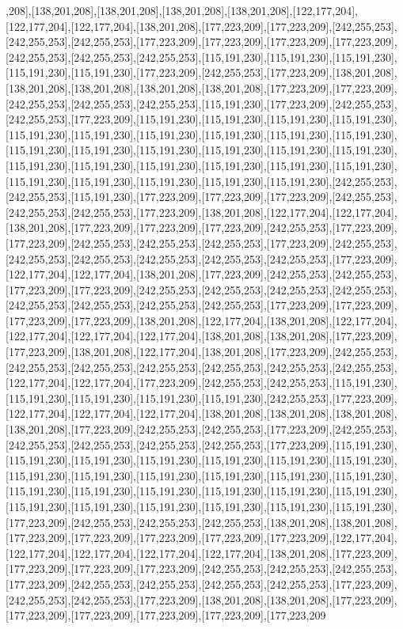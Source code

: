 ,208],[138,201,208],[138,201,208],[138,201,208],[138,201,208],[122,177,204],[122,177,204],[122,177,204],[138,201,208],[177,223,209],[177,223,209],[242,255,253],[242,255,253],[242,255,253],[177,223,209],[177,223,209],[177,223,209],[177,223,209],[242,255,253],[242,255,253],[242,255,253],[115,191,230],[115,191,230],[115,191,230],[115,191,230],[115,191,230],[177,223,209],[242,255,253],[177,223,209],[138,201,208],[138,201,208],[138,201,208],[138,201,208],[138,201,208],[177,223,209],[177,223,209],[242,255,253],[242,255,253],[242,255,253],[115,191,230],[177,223,209],[242,255,253],[242,255,253],[177,223,209],[115,191,230],[115,191,230],[115,191,230],[115,191,230],[115,191,230],[115,191,230],[115,191,230],[115,191,230],[115,191,230],[115,191,230],[115,191,230],[115,191,230],[115,191,230],[115,191,230],[115,191,230],[115,191,230],[115,191,230],[115,191,230],[115,191,230],[115,191,230],[115,191,230],[115,191,230],[115,191,230],[115,191,230],[115,191,230],[115,191,230],[115,191,230],[242,255,253],[242,255,253],[115,191,230],[177,223,209],[177,223,209],[177,223,209],[242,255,253],[242,255,253],[242,255,253],[177,223,209],[138,201,208],[122,177,204],[122,177,204],[138,201,208],[177,223,209],[177,223,209],[177,223,209],[242,255,253],[177,223,209],[177,223,209],[242,255,253],[242,255,253],[242,255,253],[177,223,209],[242,255,253],[242,255,253],[242,255,253],[242,255,253],[242,255,253],[242,255,253],[177,223,209],[122,177,204],[122,177,204],[138,201,208],[177,223,209],[242,255,253],[242,255,253],[177,223,209],[177,223,209],[242,255,253],[242,255,253],[242,255,253],[242,255,253],[242,255,253],[242,255,253],[242,255,253],[242,255,253],[177,223,209],[177,223,209],[177,223,209],[177,223,209],[138,201,208],[122,177,204],[138,201,208],[122,177,204],[122,177,204],[122,177,204],[122,177,204],[138,201,208],[138,201,208],[177,223,209],[177,223,209],[138,201,208],[122,177,204],[138,201,208],[177,223,209],[242,255,253],[242,255,253],[242,255,253],[242,255,253],[242,255,253],[242,255,253],[242,255,253],[122,177,204],[122,177,204],[177,223,209],[242,255,253],[242,255,253],[115,191,230],[115,191,230],[115,191,230],[115,191,230],[115,191,230],[242,255,253],[177,223,209],[122,177,204],[122,177,204],[122,177,204],[138,201,208],[138,201,208],[138,201,208],[138,201,208],[177,223,209],[242,255,253],[242,255,253],[177,223,209],[242,255,253],[242,255,253],[242,255,253],[242,255,253],[242,255,253],[177,223,209],[115,191,230],[115,191,230],[115,191,230],[115,191,230],[115,191,230],[115,191,230],[115,191,230],[115,191,230],[115,191,230],[115,191,230],[115,191,230],[115,191,230],[115,191,230],[115,191,230],[115,191,230],[115,191,230],[115,191,230],[115,191,230],[115,191,230],[115,191,230],[115,191,230],[115,191,230],[115,191,230],[115,191,230],[115,191,230],[177,223,209],[242,255,253],[242,255,253],[242,255,253],[138,201,208],[138,201,208],[177,223,209],[177,223,209],[177,223,209],[177,223,209],[177,223,209],[122,177,204],[122,177,204],[122,177,204],[122,177,204],[122,177,204],[138,201,208],[177,223,209],[177,223,209],[177,223,209],[177,223,209],[242,255,253],[242,255,253],[242,255,253],[177,223,209],[242,255,253],[242,255,253],[242,255,253],[242,255,253],[177,223,209],[242,255,253],[242,255,253],[177,223,209],[138,201,208],[138,201,208],[177,223,209],[177,223,209],[177,223,209],[177,223,209],[177,223,209],[177,223,209